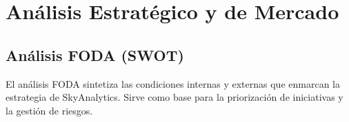 ﻿\documentclass[11pt, letterpaper]{article}
\begin{document}





\section{Análisis Estratégico y de Mercado}



\subsection{Análisis FODA (SWOT)}



El análisis FODA sintetiza las condiciones internas y externas que enmarcan la estrategia de SkyAnalytics. Sirve como base para la priorización de iniciativas y la gestión de riesgos.
\end{document}
